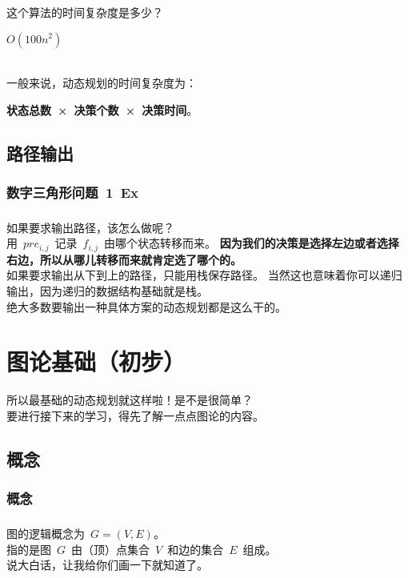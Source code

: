 \documentclass[UTF8]{beamer}
\begin{document}
	\begin{frame}
		\frametitle{\insertsubsubsection}
		这个算法的时间复杂度是多少？
		\\\pause
		\begin{center}
			$O(100 n^2)$
		\end{center}
		\ %
		\\\pause
		一般来说，动态规划的时间复杂度为：
		\\
		\begin{center}
			\textbf{状态总数~×~决策个数~×~决策时间}。
		\end{center}
	\end{frame}

	\subsection{路径输出}
	\subsubsection{数字三角形问题~1~Ex}
	\begin{frame}
		\frametitle{\insertsubsubsection}
		如果要求输出路径，该怎么做呢？
		\\\pause
		用~$pre_{i, j}$~记录~$f_{i, j}$~由哪个状态转移而来。
		\textbf{因为我们的决策是选择左边或者选择右边，所以从哪儿转移而来就肯定选了哪个的。}
		\\\pause
		如果要求输出从下到上的路径，只能用栈保存路径。
		当然这也意味着你可以递归输出，因为递归的数据结构基础就是栈。
		\\\pause
		绝大多数要输出一种具体方案的动态规划都是这么干的。
	\end{frame}

	\section{图论基础（初步）}
	\begin{frame}
		所以最基础的动态规划就这样啦！是不是很简单？
		\\
		要进行接下来的学习，得先了解一点点图论的内容。
	\end{frame}

	\subsection{概念}
	\subsubsection{概念}
	\begin{frame}
		\frametitle{\insertsubsubsection}
		图的逻辑概念为~$G = (V, E)$。
		\\
		指的是图~$G$~由（顶）点集合~$V$~和边的集合~$E$~组成。
		\\\pause
		\vspace{5mm}
		说大白话，让我给你们画一下就知道了。
	\end{frame}
\end{document}
